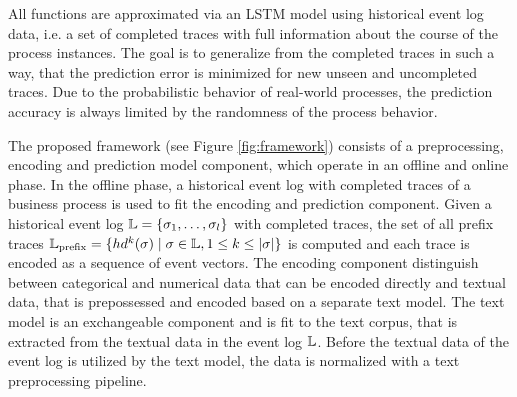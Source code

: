 All functions are approximated via an LSTM model using historical event log data, i.e. a set of completed traces with full information about the course of the process instances.
The goal is to generalize from the completed traces in such a way, that the prediction error is minimized for new unseen and uncompleted traces.
Due to the probabilistic behavior of real-world processes, the prediction accuracy is always limited by the randomness of the process behavior.

The proposed framework (see Figure \ref{fig:framework}) consists of a preprocessing, encoding and prediction model component, which operate in an offline and online phase.
In the offline phase, a historical event log with completed traces of a business process is used to fit the encoding and prediction component.
Given a historical event log $\mathbb{L} = \{\sigma_1, \dots, \sigma_l\}$ with completed traces, the set of all prefix traces $\mathbb{L}_\mathrm{prefix} = \{ hd^k(\sigma) \mid  \sigma \in \mathbb{L}, 1 \leq k \leq |\sigma|\}$ is computed and each trace is encoded as a sequence of event vectors.
The encoding component distinguish between categorical and numerical data that can be encoded directly and textual data, that is prepossessed and encoded based on a separate text model.
The text model is an exchangeable component and is fit to the text corpus, that is extracted from the textual data in the event log $\mathbb{L}$.
Before the textual data of the event log is utilized by the text model, the data is normalized with a text preprocessing pipeline.

